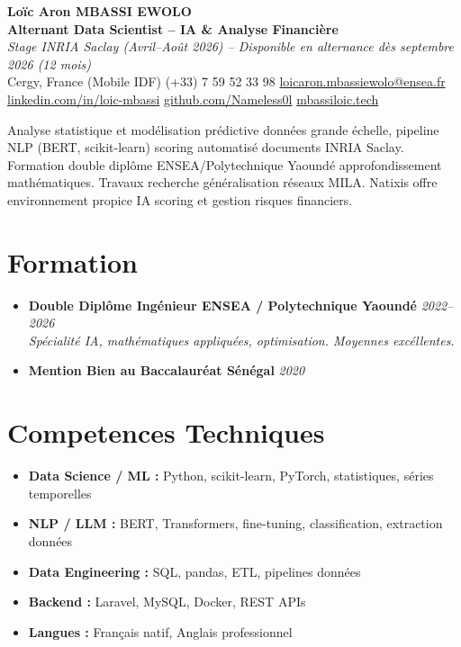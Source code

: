 \documentclass[a4paper,11pt]{article}
\begin{document}
\begin{center}
    {\Large \textbf{Lo\"ic Aron MBASSI EWOLO}} \\ \vspace{4pt}
    \textbf{\large Alternant Data Scientist -- IA \& Analyse Financi\`ere} \\
    \textit{\small Stage INRIA Saclay (Avril--Ao\^ut 2026) -- Disponible en alternance d\`es septembre 2026 (12 mois)} \\ \vspace{4pt}
    \small
    Cergy, France (Mobile IDF) \quad
    (+33) 7 59 52 33 98 \quad
    {\color{primary}\href{mailto:loicaron.mbassiewolo@ensea.fr}{loicaron.mbassiewolo@ensea.fr}} \\ \vspace{2pt}
    {\color{primary}\href{https://www.linkedin.com/in/loic-mbassi/}{linkedin.com/in/loic-mbassi}} \quad
    {\color{primary}\href{https://github.com/Nameless0l}{github.com/Nameless0l}} \quad
    {\color{primary}\href{https://mbassiloic.tech}{mbassiloic.tech}}
\end{center}
\vspace{-6pt}
\noindent\small{Analyse statistique et mod\'elisation pr\'edictive donn\'ees grande \'echelle, pipeline NLP (BERT, scikit-learn) scoring automatisé documents INRIA Saclay. Formation double dipl\^ome ENSEA/Polytechnique Yaound\'e approfondissement math\'ematiques. Travaux recherche g\'en\'eralisation r\'eseaux MILA. Natixis offre environnement propice IA scoring et gestion risques financiers.}

\section{Formation}
\begin{itemize}[leftmargin=0.5cm, nosep]
    \item \textbf{Double Dipl\^ome Ing\'enieur ENSEA / Polytechnique Yaound\'e} \hfill \textit{2022--2026} \\
    \textit{Sp\'ecialit\'e IA, math\'ematiques appliqu\'ees, optimisation. Moyennes exc\'ellentes.}
    \item \textbf{Mention Bien au Baccalaur\'eat S\'en\'egal} \hfill \textit{2020}
\end{itemize}

\section{Competences Techniques}
\begin{itemize}[leftmargin=0.5cm, nosep]
    \item \textbf{Data Science / ML :} Python, scikit-learn, PyTorch, statistiques, s\'eries temporelles
    \item \textbf{NLP / LLM :} BERT, Transformers, fine-tuning, classification, extraction donn\'ees
    \item \textbf{Data Engineering :} SQL, pandas, ETL, pipelines donn\'ees
    \item \textbf{Backend :} Laravel, MySQL, Docker, REST APIs
    \item \textbf{Langues :} Fran\c{c}ais natif, Anglais professionnel
\end{itemize}
\end{document}
